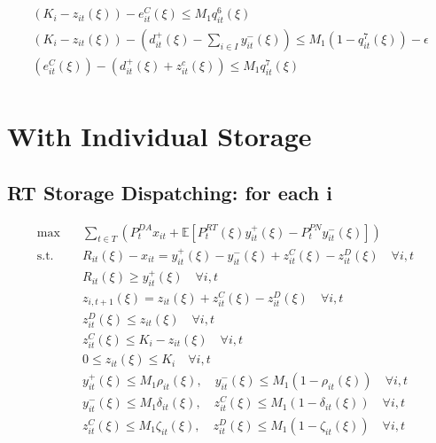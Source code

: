 \documentclass[10pt]{article}
\begin{document}
\begin{subequations}
\begin{align*}
    &\left(K_i - z_{it}(\xi)\right) - e^C_{it}(\xi) \leq M_1 q^6_{it}(\xi)&\\
    &\left(K_i - z_{it}(\xi)\right) - \left(d^+_{it}(\xi) - \sum_{i \in I}y^-_{it}(\xi)\right) \leq M_1 (1-q^7_{it}(\xi))-\epsilon&\\
    & \left(e^C_{it}(\xi) \right) - \left( d^+_{it}(\xi) + z^c_{it}(\xi)\right) \leq M_1 q^7_{it}(\xi)&\\
    \end{align*}
\end{subequations}

\newpage

\section{With Individual Storage}
\subsection{RT Storage Dispatching: for each i}
\begin{subequations}
    \begin{align}
    \text{max} \quad &\sum_{t\in T}\left(P_t^{DA}x_{it} + \mathbb{E}\left[P_t^{RT}(\xi)y_{it}^{+}(\xi) - P_t^{PN}y_{it}^{-}(\xi)\right]\right)&\\    
    \text{s.t.} \quad &R_{it}(\xi) - x_{it} = y_{it}^{+}(\xi) - y_{it}^{-}(\xi) + z^C_{it}(\xi) - z^D_{it}(\xi)\quad  \forall i, t &\\ 
    &R_{it}(\xi) \geq y^+_{it}(\xi) \quad \forall i ,t &\\
    &z_{i,t+1}(\xi) = z_{it}(\xi) + z^C_{it}(\xi) - z^D_{it}(\xi) \quad \forall i, t &\\
    &z^D_{it}(\xi) \le z_{it}(\xi) \quad \forall i, t &\\
    &z^C_{it}(\xi) \le K_i-z_{it}(\xi) \quad \forall i, t &\\
    &0 \leq z_{it}(\xi) \leq K_i \quad \forall i, t &\\
    &y^+_{it}(\xi) \leq M_1 \rho_{it}(\xi), \quad y^-_{it}(\xi) \leq M_1 (1 - \rho_{it}(\xi)) \quad \forall i, t &\\
    &y^-_{it}(\xi) \leq M_1 \delta_{it}(\xi), \quad z^C_{it}(\xi) \leq M_1 (1 - \delta_{it}(\xi)) \quad \forall i, t &\\
    &z^C_{it}(\xi) \leq M_1 \zeta_{it}(\xi), \quad z^D_{it}(\xi) \leq M_1 (1 - \zeta_{it}(\xi)) \quad \forall i, t &
    \end{align}
\end{subequations}
\end{document}
